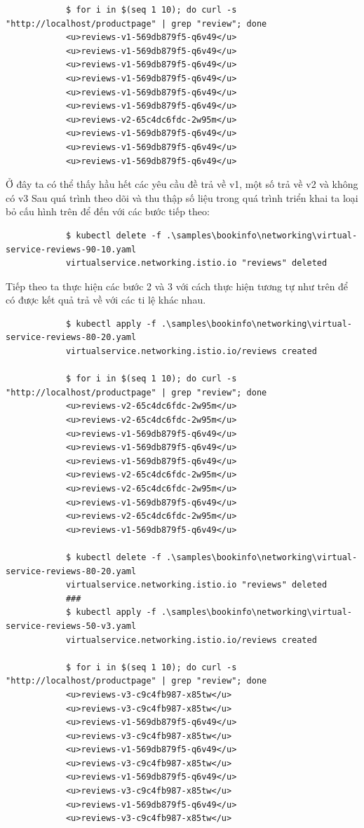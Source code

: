 \documentclass[12pt,a4paper]{report}
\begin{document}
{{\begin{lstlisting}
			$ for i in $(seq 1 10); do curl -s "http://localhost/productpage" | grep "review"; done
			<u>reviews-v1-569db879f5-q6v49</u>
			<u>reviews-v1-569db879f5-q6v49</u>
			<u>reviews-v1-569db879f5-q6v49</u>
			<u>reviews-v1-569db879f5-q6v49</u>
			<u>reviews-v1-569db879f5-q6v49</u>
			<u>reviews-v1-569db879f5-q6v49</u>
			<u>reviews-v2-65c4dc6fdc-2w95m</u>
			<u>reviews-v1-569db879f5-q6v49</u>
			<u>reviews-v1-569db879f5-q6v49</u>
			<u>reviews-v1-569db879f5-q6v49</u>
		\end{lstlisting}
		Ở đây ta có thể thấy hầu hết các yêu cầu đề trả về v1, một số trả về v2 và không có v3
		Sau quá trình theo dõi và thu thập số liệu trong quá trình triển khai ta loại bỏ cấu hình trên để đến với các bước tiếp theo:
		\begin{lstlisting}
			$ kubectl delete -f .\samples\bookinfo\networking\virtual-service-reviews-90-10.yaml
			virtualservice.networking.istio.io "reviews" deleted
		\end{lstlisting}
		Tiếp theo ta thực hiện các bước 2 và 3 với cách thực hiện tương tự như trên để có được kết quả trả về với các ti lệ khác nhau.
		\begin{lstlisting}
			$ kubectl apply -f .\samples\bookinfo\networking\virtual-service-reviews-80-20.yaml
			virtualservice.networking.istio.io/reviews created
			
			$ for i in $(seq 1 10); do curl -s "http://localhost/productpage" | grep "review"; done
			<u>reviews-v2-65c4dc6fdc-2w95m</u>
			<u>reviews-v2-65c4dc6fdc-2w95m</u>
			<u>reviews-v1-569db879f5-q6v49</u>
			<u>reviews-v1-569db879f5-q6v49</u>
			<u>reviews-v1-569db879f5-q6v49</u>
			<u>reviews-v2-65c4dc6fdc-2w95m</u>
			<u>reviews-v2-65c4dc6fdc-2w95m</u>
			<u>reviews-v1-569db879f5-q6v49</u>
			<u>reviews-v2-65c4dc6fdc-2w95m</u>
			<u>reviews-v1-569db879f5-q6v49</u>
			
			$ kubectl delete -f .\samples\bookinfo\networking\virtual-service-reviews-80-20.yaml
			virtualservice.networking.istio.io "reviews" deleted
			###
			$ kubectl apply -f .\samples\bookinfo\networking\virtual-service-reviews-50-v3.yaml
			virtualservice.networking.istio.io/reviews created
			
			$ for i in $(seq 1 10); do curl -s "http://localhost/productpage" | grep "review"; done
			<u>reviews-v3-c9c4fb987-x85tw</u>
			<u>reviews-v3-c9c4fb987-x85tw</u>
			<u>reviews-v1-569db879f5-q6v49</u>
			<u>reviews-v3-c9c4fb987-x85tw</u>
			<u>reviews-v1-569db879f5-q6v49</u>
			<u>reviews-v3-c9c4fb987-x85tw</u>
			<u>reviews-v1-569db879f5-q6v49</u>
			<u>reviews-v3-c9c4fb987-x85tw</u>
			<u>reviews-v1-569db879f5-q6v49</u>
			<u>reviews-v3-c9c4fb987-x85tw</u>
			

\end{lstlisting}}}
\end{document}

